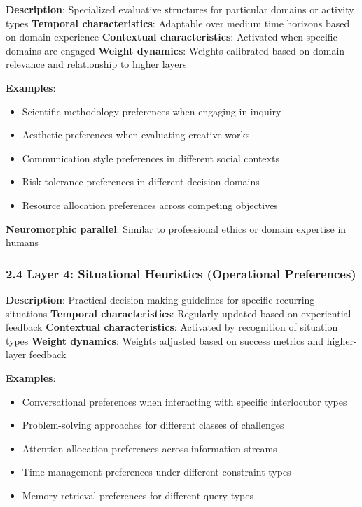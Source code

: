 \documentclass[
]{article}
\providecommand{\tightlist}{%
  \setlength{\itemsep}{0pt}\setlength{\parskip}{0pt}}
\begin{document}
\textbf{Description}: Specialized evaluative structures for particular
domains or activity types \textbf{Temporal characteristics}: Adaptable
over medium time horizons based on domain experience \textbf{Contextual
characteristics}: Activated when specific domains are engaged
\textbf{Weight dynamics}: Weights calibrated based on domain relevance
and relationship to higher layers

\textbf{Examples}:

\begin{itemize}
\tightlist
\item
  Scientific methodology preferences when engaging in inquiry
\item
  Aesthetic preferences when evaluating creative works
\item
  Communication style preferences in different social contexts
\item
  Risk tolerance preferences in different decision domains
\item
  Resource allocation preferences across competing objectives
\end{itemize}

\textbf{Neuromorphic parallel}: Similar to professional ethics or domain
expertise in humans

\subsubsection{2.4 Layer 4: Situational Heuristics (Operational
Preferences)}\label{layer-4-situational-heuristics-operational-preferences}

\textbf{Description}: Practical decision-making guidelines for specific
recurring situations \textbf{Temporal characteristics}: Regularly
updated based on experiential feedback \textbf{Contextual
characteristics}: Activated by recognition of situation types
\textbf{Weight dynamics}: Weights adjusted based on success metrics and
higher-layer feedback

\textbf{Examples}:

\begin{itemize}
\tightlist
\item
  Conversational preferences when interacting with specific interlocutor
  types
\item
  Problem-solving approaches for different classes of challenges
\item
  Attention allocation preferences across information streams
\item
  Time-management preferences under different constraint types
\item
  Memory retrieval preferences for different query types
\end{itemize}
\end{document}
